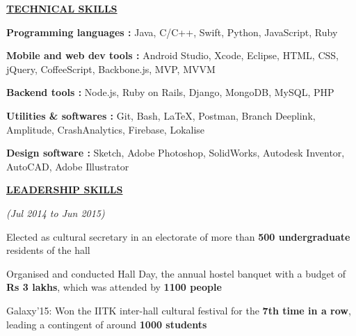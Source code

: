 \documentclass[a4paper]{deedy-resume} %
\begin{document}
{\uppercase\uline{\textbf{\large{Technical Skills}}\hfill}}
\microspace
\begin{tightitemize}
\item \textbf{Programming languages \hspace{10pt}:  } Java, C/C++, Swift, Python, JavaScript, Ruby
\item \textbf{Mobile and web dev tools   \hspace{1pt} : } Android Studio, Xcode, Eclipse, HTML, CSS, jQuery, CoffeeScript, Backbone.js, MVP, MVVM 
\item \textbf{Backend tools  \hspace{51pt} : }   Node.js, Ruby on Rails, Django, MongoDB, MySQL, PHP
\item \textbf{Utilities \& softwares \hspace{27pt}: } Git, Bash, \LaTeX, Postman, Branch Deeplink, Amplitude, CrashAnalytics, Firebase, Lokalise
\item \textbf{Design software \hspace{45pt}: } Sketch, Adobe Photoshop, SolidWorks, Autodesk Inventor, AutoCAD, Adobe Illustrator
\end{tightitemize}
\sectionspace
{\uppercase\uline{\textbf{\large{Leadership Skills}}\hfill}}

\microspace
{}
\hfill {\textit{\small(Jul 2014 to Jun 2015)}}\\
\begin{tightitemize}
\item Elected as cultural secretary in an electorate of more than \textbf{500 undergraduate} residents of the hall
\item Organised and conducted Hall Day, the annual hostel banquet with a budget of \textbf{Rs 3 lakhs}, which was attended by \textbf{1100 people}
\item Galaxy'15: Won the IITK inter-hall cultural festival for the \textbf{7th time in a row}, leading a contingent of around \textbf{1000 students}
\end{tightitemize}


\end{document}
